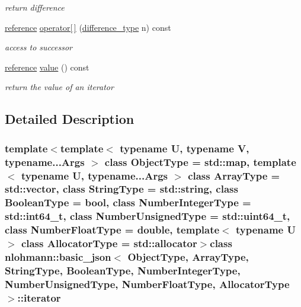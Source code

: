 \begin{DoxyCompactItemize}
\begin{DoxyCompactList}\small\item\em return difference \end{DoxyCompactList}\item 
\hypertarget{classnlohmann_1_1basic__json_1_1iterator_a7e01532727c10f87926dac4eb8e170f4_a7e01532727c10f87926dac4eb8e170f4}{\hyperlink{classnlohmann_1_1basic__json_1_1const__iterator_aefd248cac6493eed1e6ff53ba6a63eb2_aefd248cac6493eed1e6ff53ba6a63eb2}{reference} \hyperlink{classnlohmann_1_1basic__json_1_1iterator_a7e01532727c10f87926dac4eb8e170f4_a7e01532727c10f87926dac4eb8e170f4}{operator\mbox{[}$\,$\mbox{]}} (\hyperlink{classnlohmann_1_1basic__json_1_1const__iterator_a49d7c3e9ef3280df03052cce988b792f_a49d7c3e9ef3280df03052cce988b792f}{difference\-\_\-type} n) const }\label{classnlohmann_1_1basic__json_1_1iterator_a7e01532727c10f87926dac4eb8e170f4_a7e01532727c10f87926dac4eb8e170f4}

\begin{DoxyCompactList}\small\item\em access to successor \end{DoxyCompactList}\item 
\hypertarget{classnlohmann_1_1basic__json_1_1iterator_a8ffbf287736048e683f58306fdb8701f_a8ffbf287736048e683f58306fdb8701f}{\hyperlink{classnlohmann_1_1basic__json_1_1const__iterator_aefd248cac6493eed1e6ff53ba6a63eb2_aefd248cac6493eed1e6ff53ba6a63eb2}{reference} \hyperlink{classnlohmann_1_1basic__json_1_1iterator_a8ffbf287736048e683f58306fdb8701f_a8ffbf287736048e683f58306fdb8701f}{value} () const }\label{classnlohmann_1_1basic__json_1_1iterator_a8ffbf287736048e683f58306fdb8701f_a8ffbf287736048e683f58306fdb8701f}

\begin{DoxyCompactList}\small\item\em return the value of an iterator \end{DoxyCompactList}\end{DoxyCompactItemize}


\subsection{Detailed Description}
\subsubsection*{template$<$template$<$ typename U, typename V, typename...\-Args $>$ class Object\-Type = std\-::map, template$<$ typename U, typename...\-Args $>$ class Array\-Type = std\-::vector, class String\-Type = std\-::string, class Boolean\-Type = bool, class Number\-Integer\-Type = std\-::int64\-\_\-t, class Number\-Unsigned\-Type = std\-::uint64\-\_\-t, class Number\-Float\-Type = double, template$<$ typename U $>$ class Allocator\-Type = std\-::allocator$>$class nlohmann\-::basic\-\_\-json$<$ Object\-Type, Array\-Type, String\-Type, Boolean\-Type, Number\-Integer\-Type, Number\-Unsigned\-Type, Number\-Float\-Type, Allocator\-Type $>$\-::iterator}

